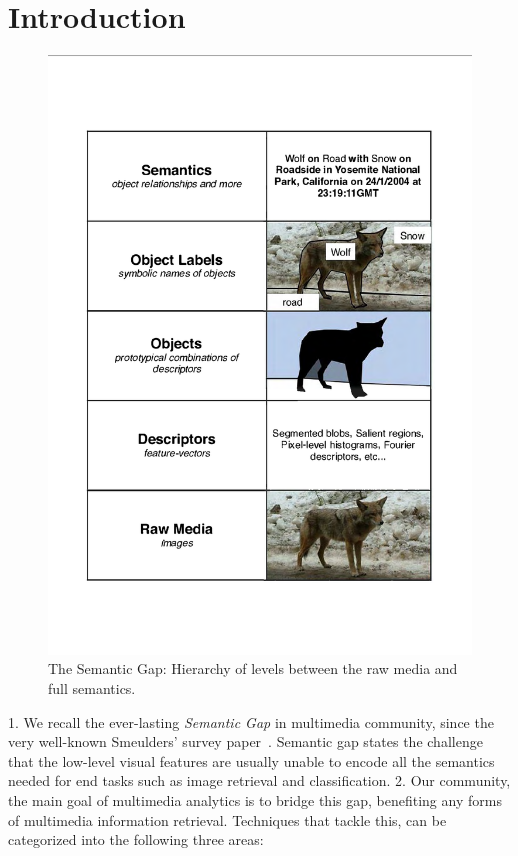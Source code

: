 \section{Introduction}\label{sec:1}
\begin{figure}
	\centering
	\includegraphics[width=1\linewidth]{figure/1.pdf}
	\caption{The Semantic Gap: Hierarchy of levels between the raw media and full semantics.}
	\label{fig:1}
\end{figure}
1. We recall the ever-lasting \emph{Semantic Gap} in multimedia community, since the very well-known Smeulders' survey paper~\cite{smeulders2000content}. Semantic gap states the challenge that the low-level visual features are usually unable to encode all the semantics needed for end tasks such as image retrieval and classification. 
2. Our community, the main goal of multimedia analytics is to bridge this gap, benefiting any forms of multimedia information retrieval. Techniques that tackle this, can be categorized into the following three areas:
